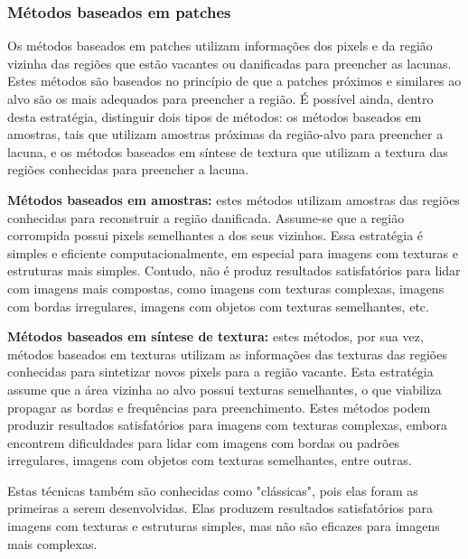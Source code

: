 \subsubsection{Métodos baseados em patches} \label{patch}
Os métodos baseados em patches utilizam informações dos pixels e da região vizinha das regiões que estão vacantes ou danificadas para preencher as lacunas. Estes métodos são baseados no princípio de que a patches próximos e similares ao alvo são os mais adequados para preencher a região. É possível ainda, dentro desta estratégia, distinguir dois tipos de métodos: os métodos baseados em amostras, tais que utilizam amostras próximas da região-alvo para preencher a lacuna, e os métodos baseados em síntese de textura que utilizam a textura das regiões conhecidas para preencher a lacuna.

\begin{list}{}{}
\item \textbf{Métodos baseados em amostras:} \label{sample}
estes métodos utilizam amostras das regiões conhecidas para reconstruir a região danificada. Assume-se que a região corrompida possui pixels semelhantes a dos seus vizinhos. Essa estratégia é simples e eficiente computacionalmente, em especial para imagens com texturas e estruturas mais simples. Contudo, não é produz resultados satisfatórios para lidar com imagens mais compostas, como imagens com texturas complexas, imagens com bordas irregulares, imagens com objetos com texturas semelhantes, etc.
\item \textbf{Métodos baseados em síntese de textura:} \label{texture}
estes métodos, por sua vez, métodos baseados em texturas utilizam as informações das texturas das regiões conhecidas para sintetizar novos pixels para a região vacante. Esta estratégia assume que a área vizinha ao alvo possui texturas semelhantes, o que viabiliza propagar as bordas e frequências para preenchimento. Estes métodos podem produzir resultados satisfatórios para imagens com texturas complexas, embora encontrem dificuldades para lidar com imagens com bordas ou padrões irregulares, imagens com objetos com texturas semelhantes, entre outras.
\end{list}

Estas técnicas também são conhecidas como "clássicas", pois elas foram as primeiras a serem desenvolvidas. Elas produzem resultados satisfatórios para imagens com texturas e estruturas simples, mas não são eficazes para imagens mais complexas.


